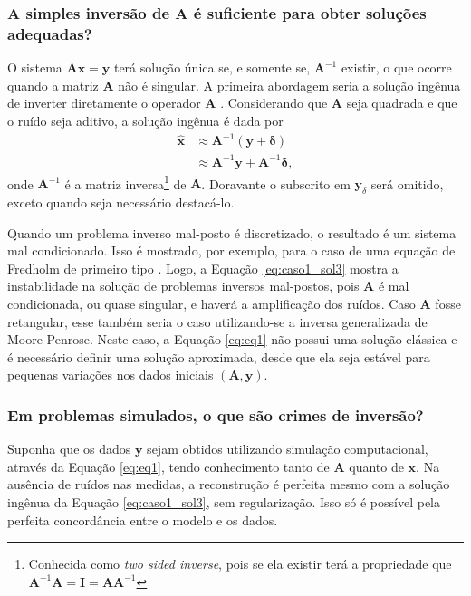 \subsubsection{A simples inversão de $\mathbf{A}$ é suficiente para obter soluções adequadas?}
O sistema $\mathbf{A} \mathbf{x} = \mathbf{y}$ terá solução única se, e somente se, $\mathbf{A}^{-1}$ existir, o que ocorre quando a matriz $\mathbf{A}$ não é singular. A primeira abordagem seria a solução ingênua de inverter diretamente o operador $\mathbf{A}$ \cite[pág. 30]{hansen2010discrete}. Considerando que $\mathbf{A}$ seja quadrada e que o ruído seja aditivo, a solução ingênua é dada por
\begin{equation}
\begin{aligned}
\hat{\mathbf{x}} & \approx  \mathbf{A}^{-1}\left(\mathbf{y}+\bm{\delta}\right) \\
 &  \approx \mathbf{A}^{-1}\mathbf{y} + \mathbf{A}^{-1} \bm{\delta},
\label{eq:caso1_sol3}
\end{aligned}
\end{equation} 
onde $\mathbf{A}^{-1}$ é a matriz inversa\footnote{Conhecida como \textit{two sided inverse}, pois se ela existir terá a propriedade que $\mathbf{A}^{-1} \mathbf{A} = \mathbf{I} = \mathbf{A} \mathbf{A}^{-1} $} de $\mathbf{A}$. Doravante o subscrito em $\mathbf{y}_{\delta}$ será omitido, exceto quando seja necessário destacá-lo. 

Quando um problema inverso mal-posto é discretizado, o resultado é um sistema mal condicionado. Isso é mostrado, por exemplo, para o caso de uma equação de Fredholm de primeiro tipo \cite[Seção 3.3]{hansen2010discrete}. Logo, a Equação \eqref{eq:caso1_sol3} mostra a instabilidade na solução de problemas inversos mal-postos, pois $\mathbf{A}$ é mal condicionada, ou quase singular, e haverá a amplificação dos ruídos. Caso $\mathbf{A}$ fosse retangular, esse também seria o caso utilizando-se a inversa generalizada de Moore-Penrose. Neste caso, a Equação \eqref{eq:eq1} não possui uma solução clássica e é necessário definir uma solução aproximada, desde que ela seja estável para pequenas variações nos dados iniciais  $(\mathbf{A}, \mathbf{y})$. 


\subsubsection{Em problemas simulados, o que são crimes de inversão?}

Suponha que os dados $\mathbf{y}$ sejam obtidos utilizando  simulação computacional,  através da Equação \eqref{eq:eq1}, tendo conhecimento tanto de $\mathbf{A}$ quanto de $\mathbf{x}$. Na ausência de ruídos nas medidas, a reconstrução é perfeita mesmo com a solução ingênua da Equação \eqref{eq:caso1_sol3}, sem regularização. Isso só é possível pela perfeita concordância entre o modelo e os dados. 

